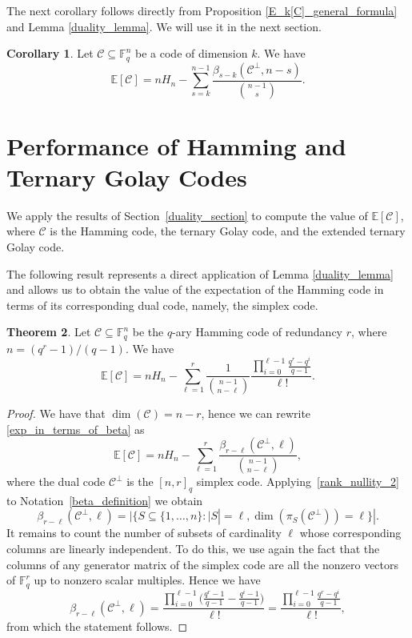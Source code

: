 \documentclass[11pt,a4paper,reqno,twoside]{article}
\theoremstyle{definition}
\newtheorem{theorem}{Theorem}[section]
\newtheorem{corollary}[theorem]{Corollary}
\newcommand{\F}{\mathbb{F}}
\newcommand{\E}{\mathbb{E}}
\newcommand{\mC}{\mathcal{C}}
\begin{document}
The next corollary follows directly from Proposition \ref{E_k[C]_general_formula} and Lemma \ref{duality_lemma}. We will use it in the next section.

\begin{corollary}
    Let $\mathcal{C} \subseteq \F_q^n$ be
    a code of dimension $k$. We have 
    \begin{equation} \label{exp_in_terms_of_beta}
        \mathbb{E}[\mathcal{C}] = nH_n -  \sum_{s=k}^{n-1} \frac{\beta_{s-k}(\mathcal{C}^{\perp},n-s)}{\binom{n-1}{s}}.
    \end{equation}
\end{corollary}




\section{Performance of Hamming and Ternary Golay Codes} \label{Hamming_section}

We apply the results of Section~\ref{duality_section} to compute the value of $\E[\mC]$, where $\mC$ is the Hamming code, 
the ternary Golay code, and the extended ternary Golay code.

The following result represents a direct application of Lemma \ref{duality_lemma} and allows us to obtain the value of the expectation of the Hamming code in terms of its corresponding dual code, namely, the simplex code.

\begin{theorem} \label{thm_E_k_Hamming}
    Let $\mathcal{C} \subseteq \mathbb{F}_q^n$ be the $q$-ary Hamming code of redundancy $r$, where $n=(q^r-1)/(q-1)$. We have 
    \[
    \mathbb{E}[\mathcal{C}] = nH_n -  \sum_{\ell=1}^{r} \frac{1}{\binom{n-1}{n-\ell}}\frac{\prod_{i = 0}^{\ell-1} \frac{q^r-q^i}{q-1}}{\ell !}.
    \]
\end{theorem}
\begin{proof}
    We have that $\dim(\mC) = n-r$, hence we can rewrite \eqref{exp_in_terms_of_beta} as 
    \[
    \mathbb{E}[\mathcal{C}] = n H_n - \sum_{\ell=1}^{r} \frac{\beta_{r-\ell}(\mathcal{C}^{\perp},\ell)}{\binom{n-1}{n-\ell}},
    \]
    where the dual code $\mathcal{C}^{\perp}$ is the $[n,r]_q$ simplex code. Applying~\eqref{rank_nullity_2} to Notation~\ref{beta_definition} we obtain
    \[
    \beta_{r-\ell}(\mathcal{C}^\perp,\ell) =  |\{ S \subseteq \{1, \ldots, n\} : |S| = \ell, \dim(\pi_S(\mathcal{C}^\perp))=\ell \}|.
    \]
    It remains to count the number of subsets of cardinality $\ell$ whose corresponding columns are linearly independent. To do this, we use again the fact that the columns of any generator matrix of the simplex code are all the nonzero vectors of $\mathbb{F}_q^r$ up to nonzero scalar multiples. Hence we have
    \[
    \beta_{r-\ell}(\mathcal{C}^\perp,\ell) = \frac{\prod_{i=0}^{\ell-1} \Big(\frac{q^r-1}{q-1} - \frac{q^i-1}{q-1}\Big)}{\ell!} = \frac{\prod_{i=0}^{\ell-1} \frac{q^r-q^i}{q-1}}{\ell!},
    \]
    from which the statement follows.
\end{proof}
\end{document}
